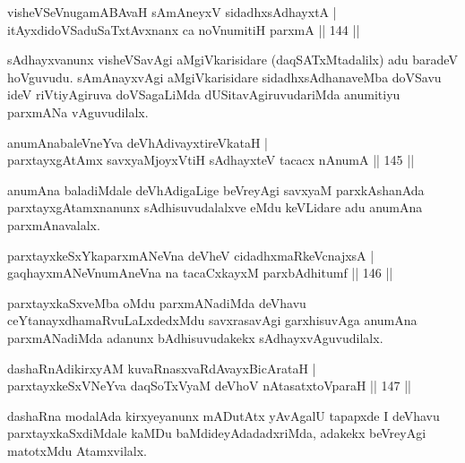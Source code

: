 \begin{shl}
visheVSeV\s nugamABAvaH sAmAneyxV sidadhxsAdhayxtA | \\
itAyxdidoVSaduSaTxtAvxnanx ca noV\s numitiH parxmA \hfill||  144 ||  
\end{shl}

\begin{artha}
sAdhayxvanunx visheVSavAgi aMgiVkarisidare (daqSATxMtadalilx) adu baradeV hoVguvudu. sAmAnayxvAgi aMgiVkarisidare sidadhxsAdhanaveMba doVSavu ideV riVtiyAgiruva doVSagaLiMda dUSitavAgiruvudariMda anumitiyu parxmANa vAguvudilalx.
\end{artha}

\begin{shl}
anumAnabaleVneYva deVhAdivayxtireVkataH | \\
parxtayxgAtAmx savxyaMjoyxVtiH sAdhayxteV tacacx nAnumA \hfill||  145 ||  
\end{shl}

\begin{artha}
anumAna baladiMdale deVhAdigaLige beVreyAgi savxyaM parxkAshanAda parxtayxgAtamxnanunx sAdhisuvudalalxve eMdu keVLidare adu anumAna parxmAnavalalx.
\end{artha}

\begin{shl}
parxtayxkeSxYkaparxmANeVna deVheV cidadhxmaRkeV\s cnajxsA | \\
gaqhayxmANeV\s numAneVna na tacaCxkayxM parxbAdhitumf \hfill||  146 ||  
\end{shl}

\begin{artha}
parxtayxkaSxveMba oMdu parxmANadiMda deVhavu ceYtanayxdhamaRvuLaLxdedxMdu savxrasavAgi garxhisuvAga anumAna parxmANadiMda adanunx bAdhisuvudakekx sAdhayxvAguvudilalx.
\end{artha}

\begin{shl}
dashaRnAdikirxyAM kuvaRnasxvaRdA\s vayxBicArataH | \\
parxtayxkeSxVNeYva daqSoTxV\s yaM deVhoV nAtasatxtoV\s paraH \hfill||  147 ||  
\end{shl}

\begin{artha}
dashaRna modalAda kirxyeyanunx mADutAtx yAvAgalU tapapxde I deVhavu parxtayxkaSxdiMdale kaMDu baMdideyAdadadxriMda, adakekx beVreyAgi matotxMdu Atamxvilalx.
\end{artha}


